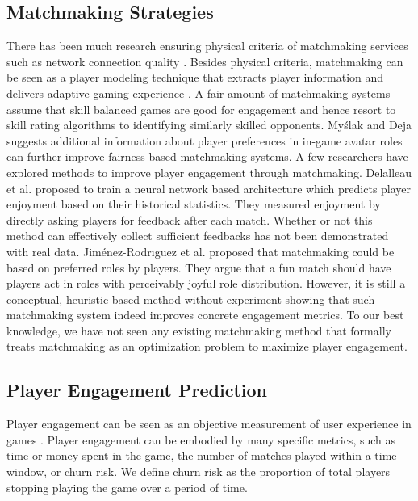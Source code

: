 \subsection{Matchmaking Strategies}
There has been much research ensuring physical criteria of matchmaking services such as network connection quality \cite{agarwal2009matchmaking,lee2008measurement,manweiler2011switchboard}. Besides physical criteria, matchmaking can be seen as a player modeling technique \cite{Yannakakis2013} that extracts player information and delivers adaptive gaming experience \cite{chen2015analytics}. A fair amount of matchmaking systems assume that skill balanced games are good for engagement \cite{graepel2006ranking} and hence resort to skill rating algorithms to identifying similarly skilled opponents. My\'{s}lak and Deja \cite{myslak2014developing} suggests additional information about player preferences in in-game avatar roles can further improve fairness-based matchmaking systems. A few researchers have explored methods to improve player engagement through matchmaking. Delalleau et al. \cite{Delalleau2012} proposed to train a neural network based architecture which predicts player enjoyment based on their historical statistics. They measured enjoyment by directly asking players for feedback after each match. Whether or not this method can effectively collect sufficient feedbacks has not been demonstrated with real data. Jim{\'e}nez-Rodr{\i}guez et al. \cite{jimenez2011matchmaking} proposed that matchmaking could be based on preferred roles by players. They argue that a fun match should have players act in  roles with perceivably joyful role distribution. However, it is still a conceptual, heuristic-based method without experiment showing that such matchmaking system indeed improves concrete engagement metrics. To our best knowledge, we have not seen any existing matchmaking method that formally treats matchmaking as an optimization problem to maximize player engagement.

\subsection{Player Engagement Prediction}
Player engagement can be seen as an objective measurement of user experience in games \cite{bernhaupt2010user}. Player engagement can be embodied by many specific metrics, such as time or money spent in the game, the number of matches played within a time window, or churn risk.  We define churn risk as the proportion of total players stopping playing the game over a period of time. 

